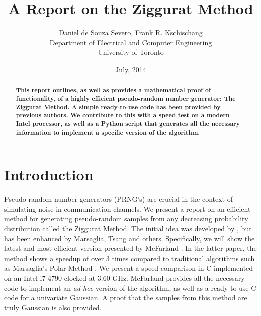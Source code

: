 \documentclass[11pt,onecolumn]{article}
\begin{document}
\title{A Report on the Ziggurat Method}
\author{Daniel de Souza Severo, Frank R. Kschischang\\
Department of Electrical and Computer Engineering\\
University of Toronto}
\date{July, 2014}
\maketitle
\begin{abstract}

\textbf{This report outlines, as well as provides a mathematical proof of functionality, of a highly efficient pseudo-random number generator: The Ziggurat Method. A simple ready-to-use code has been provided by previous authors. We contribute to this with a speed test on a modern Intel processor, as well as a Python script that generates all the necessary information to implement a specific version of the algorithm.}
\end{abstract}

\section{Introduction}
Pseudo-random number generators (PRNG's) are crucial in the context of simulating noise in communication channels. We present a report on an efficient method for generating pseudo-random samples from any decreasing probability distribution called the Ziggurat Method. The initial idea was developed by \cite{marsaglia1964convenient}, but has been enhanced by Marsaglia, Tsang \cite{marsaglia2000ziggurat} and others. Specifically, we will show the latest and most efficient version presented by McFarland \cite{mcfarland2016modified}. In the latter paper, the method shows a speedup of over 3 times compared to traditional algorithms such as Marsaglia's Polar Method \cite{marsaglia1984fast}. We present a speed comparison in C implemented on an Intel i7-4790 clocked at 3.60 GHz. McFarland \cite{mcfarland2016modified} provides all the necessary code to implement an \textit{ad hoc} version of the algorithm, as well as a ready-to-use C code for a univariate Gaussian. A proof that the samples from this method are truly Gaussian is also provided.
\end{document}
